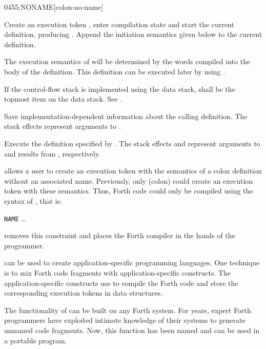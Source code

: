 \begin{worddef}{0455}{:NONAME}[colon-no-name]
\item {}

	Create an execution token , enter compilation state
	and start the current definition, producing .
	Append the initiation semantics given below to the current
	definition.

	The execution semantics of  will be determined by the
	words compiled into the body of the definition. This definition
	can be executed later by using  .

	If the control-flow stack is implemented using the data stack,
	 shall be the topmost item on the data stack.
	See .

\init

	Save implementation-dependent information 
	about the calling definition. The stack effects 
	represent arguments to .

\execute[xt]

	Execute the definition specified by . The stack
	effects  and  represent arguments to
	and results from , respectively.

	\begin{defer}
	\rationale %
		 allows a user to create an execution token
		with the semantics of a colon definition without an associated
		name. Previously, only \word{:} (colon) could create an
		execution token with these semantics. Thus, Forth code could
		only be compiled using the syntax of \word{:}, that is:

		\tab \word{:} \texttt{NAME} {\ldots} \word{;}

		 removes this constraint and places the Forth
		compiler in the hands of the programmer.

		 can be used to create application-specific
		programming languages. One technique is to mix Forth code
		fragments with application-specific constructs. The
		application-specific constructs use  to compile
		the Forth code and store the corresponding execution tokens
		in data structures.

		The functionality of  can be built on any Forth
		system. For years, expert Forth programmers have exploited
		intimate knowledge of their systems to generate unnamed code
		fragments. Now, this function has been named and can be used
		in a portable program.


\end{defer}
\end{worddef}
